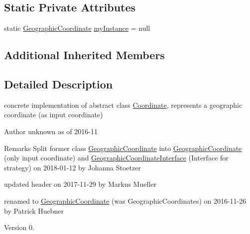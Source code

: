 \subsection*{Static Private Attributes}
\begin{DoxyCompactItemize}
\item 
static \hyperlink{classcoordinates_1_1_geographic_coordinate}{Geographic\+Coordinate} \hyperlink{classcoordinates_1_1_geographic_coordinate_a53dc73fad8c6e068de7792a5c886f78f}{my\+Instance} = null
\end{DoxyCompactItemize}
\subsection*{Additional Inherited Members}


\subsection{Detailed Description}
concrete implementation of abstract class \hyperlink{classcoordinates_1_1_coordinate}{Coordinate}, represents a geographic coordinate (as input coordinate)~\newline
 

\begin{DoxyAuthor}{Author}
unknown as of 2016-\/11 
\end{DoxyAuthor}
\begin{DoxyRemark}{Remarks}
Split former class \hyperlink{classcoordinates_1_1_geographic_coordinate}{Geographic\+Coordinate} into \hyperlink{classcoordinates_1_1_geographic_coordinate}{Geographic\+Coordinate} (only input coordinate) and \hyperlink{classcoordinates_1_1_geographic_coordinate_interface}{Geographic\+Coordinate\+Interface} (Interface for strategy) on 2018-\/01-\/12 by Johanna Stoetzer 

updated header on 2017-\/11-\/29 by Markus Mueller 

renamed to \hyperlink{classcoordinates_1_1_geographic_coordinate}{Geographic\+Coordinate} (was Geographic\+Coordinates) on 2016-\/11-\/26 by Patrick Huebner 
\end{DoxyRemark}
\begin{DoxyVersion}{Version}
0. 
\end{DoxyVersion}


